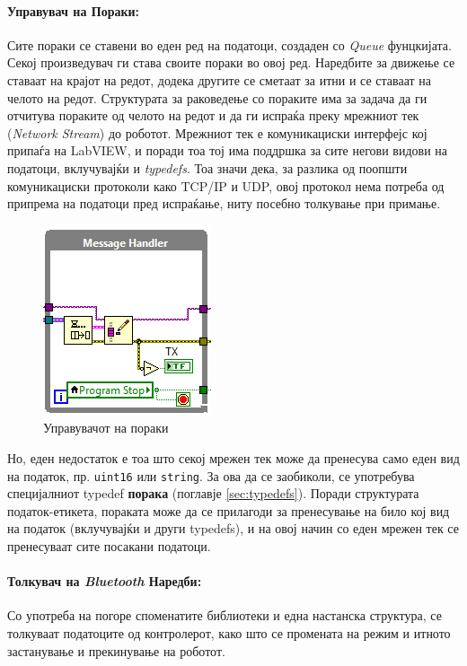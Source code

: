\documentclass[11pt]{article}
\begin{document}
    \bigbreak

    \paragraph{Управувач на Пораки:\\} %
      \label{sec:message_handler}
      Сите пораки се ставени во еден ред на податоци, создаден со \textit{Queue} фунцкијата. Секој произведувач ги става своите пораки во овој ред. Наредбите за движење се ставаат на крајот на редот, додека другите се сметаат за итни и се ставаат на челото на редот. Структурата за раковедење со пораките има за задача да ги отчитува пораките од челото на редот и да ги испраќа преку мрежниот тек (\textit{Network Stream}) до роботот. Мрежниот тек е комуникациски интерфејс кој припаѓа на LabVIEW, и поради тоа тој има поддршка за сите негови видови на податоци, вклучувајќи и \textit{typedefs}. Тоа значи дека, за разлика од поопшти комуникациски протоколи како TCP/IP и UDP, овој протокол нема потреба од припрема на податоци пред испраќање, ниту посебно толкување при примање.

      \begin{figure}[H]
        \centering
        \includegraphics[width=0.35\linewidth]{./images/message_handler.png}
        \caption{Управувачот на пораки}
        \end{figure}

      Но, еден недостаток е тоа што секој мрежен тек може да пренесува само еден вид на податок, пр. \verb+uint16+ или \verb+string+. За ова да се заобиколи, се употребува специјалниот typedef \textbf{порака} (поглавје \ref{sec:typedefs}). Поради структурата податок-етикета, пораката може да се прилагоди за пренесување на било кој вид на податок (вклучувајќи и други typedefs), и на овој начин со еден мрежен тек се пренесуваат сите посакани податоци.

    \paragraph{Толкувач на \textit{Bluetooth} Наредби:\\}
      Со употреба на погоре споменатите библиотеки и една настанска структура, се толкуваат податоците од контролерот, како што се промената на режим и итното застанување и прекинување на роботот.
\end{document}
